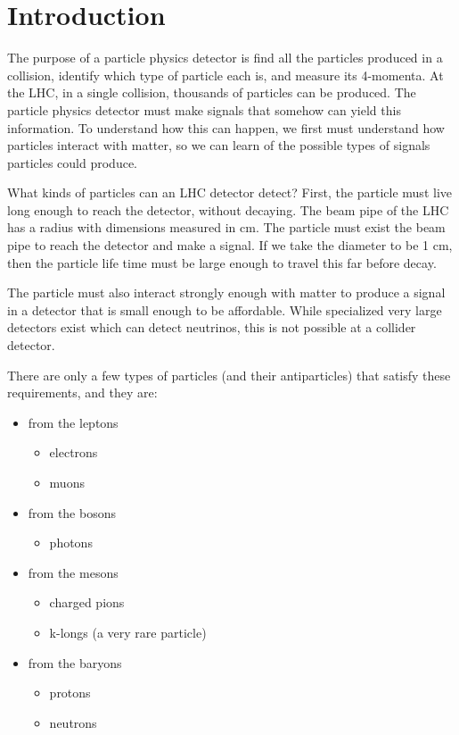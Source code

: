 
\section{Introduction}

The purpose of a particle physics detector is find all the particles produced
in a collision, identify which type of particle each is, and measure its 4-momenta.
At the LHC, in a single collision, thousands of particles can be produced.
The particle physics detector must make signals that somehow can yield this information.
To understand how this can happen, we first must understand how particles interact
with matter, so we can learn of the possible types of signals particles could produce.

What kinds of particles can an LHC detector detect?  First, the particle must live long 
enough to reach the detector, without decaying.  The beam pipe of the LHC has a 
radius with dimensions measured in cm.  The particle must exist the beam pipe to
reach the detector and make a signal.  If we take the diameter to be 1 cm, then
the particle life time must be large enough to travel this far before decay.

The particle must also interact strongly enough with matter to produce a signal in a detector that is small enough to be affordable.  While specialized very large detectors exist which can detect neutrinos, this is not possible at a collider detector.

There are only a few types of particles (and their antiparticles) that satisfy these requirements, and they are:
\begin{itemize}
\item from the leptons
\begin{itemize}
\item electrons
\item muons
\end{itemize}
\item from the bosons
\begin{itemize}
\item photons
\end{itemize}
\item from the mesons
\begin{itemize}
\item charged pions
\item k-longs (a very rare particle)
\end{itemize}
\item from the baryons
\begin{itemize}
\item protons
\item neutrons
\end{itemize}
\end{itemize}

